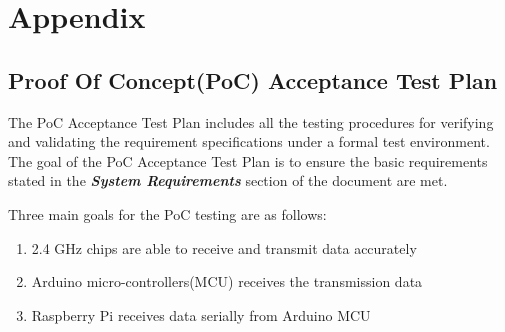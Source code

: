 %

\setcounter{section}{7}
\section{Appendix}

\subsection{Proof Of Concept(PoC) Acceptance Test Plan}
\medskip
The PoC Acceptance Test Plan includes all the testing procedures for verifying and validating the requirement specifications under a formal test environment. The goal of the PoC Acceptance Test Plan is to ensure the basic requirements stated in the \textbf{\textit{System Requirements}} section of the document are met.

\medskip
Three main goals for the PoC testing are as follows:

\begin{enumerate} 
    \item 2.4 GHz chips are able to receive and transmit data accurately
    \item Arduino micro-controllers(MCU) receives the transmission data 
    \item Raspberry Pi receives data serially from Arduino MCU
\end{enumerate}



